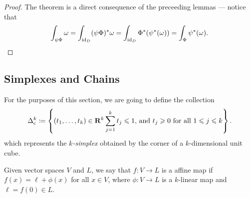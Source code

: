 \begin{proof}
The theorem is a direct consequence of the preceeding lemmas --- notice that
\[
  \int_{\psi \Phi} \omega
  = \int_{\operatorname{id}_D} (\psi \Phi)^{*} \omega
  = \int_{\operatorname{id}_D} \Phi^{*}(\psi^{*}(\omega))
  = \int_{\Phi} \psi^{*}(\omega).
\]
\end{proof}

\subsection{Simplexes and Chains}

\begin{notation}
For the purposes of this section, we are going to define the collection
\[
  \Delta_{\text{c}}^k \coloneq \left\{
    (t_{1}, \dots, t_k) \in \mathbf{R}^k \relax
    \sum_{j=1}^k t_j \leqslant 1 \text{, and }
    t_j \geqslant 0 \text{ for all } 1 \leqslant j \leqslant k
  \right\}.
\]
which represents the \emph{\(k\)-simplex} obtained by the corner of a
\(k\)-dimensional unit cube.
\end{notation}

\begin{definition}
\label{def:affine-map}
Given vector spaces \(V\) and \(L\), we say that \(f: V \to L\) is a affine map
if \(f(x) = \ell + \phi(x)\) for all \(x \in V\), where \(\phi: V \to L\) is a
\(k\)-linear map and \(\ell = f(0) \in L\).
\end{definition}

